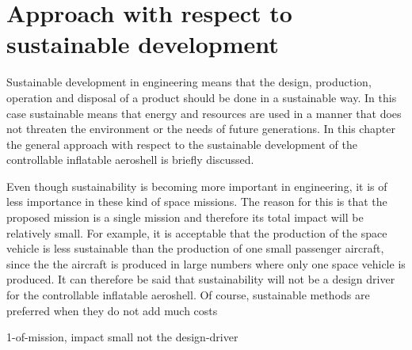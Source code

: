 \section{Approach with respect to sustainable development}\label{cha:sustain}
Sustainable development in engineering means that the design, production, operation and disposal of a product should be done in a sustainable way. In this case sustainable means that energy and resources are used in a manner that does not threaten the environment or the needs of future generations. In this chapter the general approach with respect to the sustainable development of the controllable inflatable aeroshell is briefly discussed.

Even though sustainability is becoming more important in engineering, it is of less importance in these kind of space missions. The reason for this is that the proposed mission is a single mission and therefore its total impact will be relatively small. For example, it is acceptable that the production of the space vehicle is less sustainable than the production of one small passenger aircraft, since the the aircraft is produced in large numbers where only one space vehicle is produced. It can therefore be said that sustainability will not be a design driver for the controllable inflatable aeroshell. Of course, sustainable methods are preferred when they do not add much costs

1-of-mission, impact small
not the design-driver